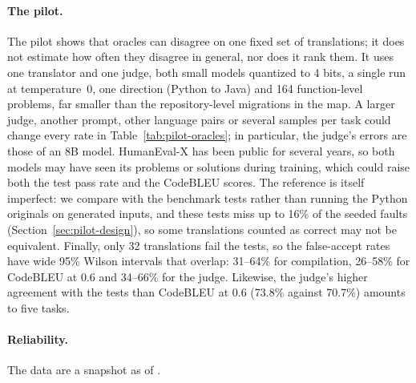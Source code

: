 \begin{added}
\paragraph{The pilot.} The pilot shows that oracles can disagree on one fixed set of translations; it does not estimate how often they disagree in general, nor does it rank them. It uses one translator and one judge, both small models quantized to 4 bits, a single run at temperature~0, one direction (Python to Java) and 164 function-level problems, far smaller than the repository-level migrations in the map. A larger judge, another prompt, other language pairs or several samples per task could change every rate in Table~\ref{tab:pilot-oracles}; in particular, the judge's errors are those of an 8B model. HumanEval-X has been public for several years, so both models may have seen its problems or solutions during training, which could raise both the test pass rate and the CodeBLEU scores. The reference is itself imperfect: we compare with the benchmark tests rather than running the Python originals on generated inputs, and these tests miss up to 16\% of the seeded faults (Section~\ref{sec:pilot-design}), so some translations counted as correct may not be equivalent. Finally, only 32 translations fail the tests, so the false-accept rates have wide 95\% Wilson intervals that overlap: 31--64\% for compilation, 26--58\% for CodeBLEU at 0.6 and 34--66\% for the judge. Likewise, the judge's higher agreement with the tests than CodeBLEU at 0.6 (73.8\% against 70.7\%) amounts to five tasks.
\end{added}

\paragraph{Reliability.}  The data are a snapshot as of . 
